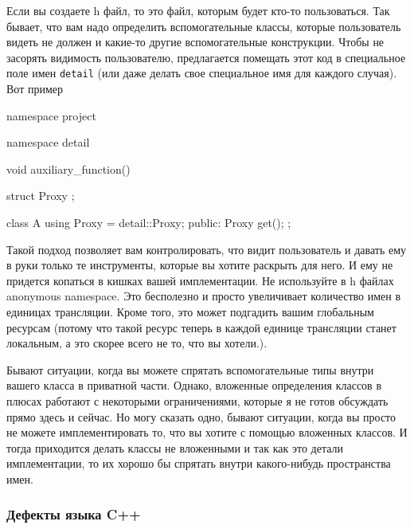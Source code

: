 Если вы создаете h файл, то это файл, которым будет кто-то пользоваться.
Так бывает, что вам надо определить вспомогательные классы, которые пользователь видеть не должен и какие-то другие вспомогательные конструкции.
Чтобы не засорять видимость пользователю, предлагается помещать этот код в специальное поле имен \verb"detail" (или даже делать свое специальное имя для каждого случая).
Вот пример
\begin{cppcode}
namespace project {
namespace detail {
void auxiliary_function() {}

struct Proxy {};
}

class A {
  using Proxy = detail::Proxy;
public:
  Proxy get();
};
}
\end{cppcode}
Такой подход позволяет вам контролировать, что видит пользователь и давать ему в руки только те инструменты, которые вы хотите раскрыть для него.
И ему не придется копаться в кишках вашей имплементации.
Не используйте в h файлах anonymous namespace.
Это бесполезно и просто увеличивает количество имен в единицах трансляции.
Кроме того, это может подгадить вашим глобальным ресурсам (потому что такой ресурс теперь в каждой единице трансляции станет локальным, а это скорее всего не то, что вы хотели.).

Бывают ситуации, когда вы можете спрятать вспомогательные типы внутри вашего класса в приватной части.
Однако, вложенные определения классов в плюсах работают с некоторыми ограничениями, которые я не готов обсуждать прямо здесь и сейчас.
Но могу сказать одно, бывают ситуации, когда вы просто не можете имплементировать то, что вы хотите с помощью вложенных классов.
И тогда приходится делать классы не вложенными и так как это детали имплементации, то их хорошо бы спрятать внутри какого-нибудь пространства имен.

\subsubsection{Дефекты языка C++}
\label{section::DefectCpp}

